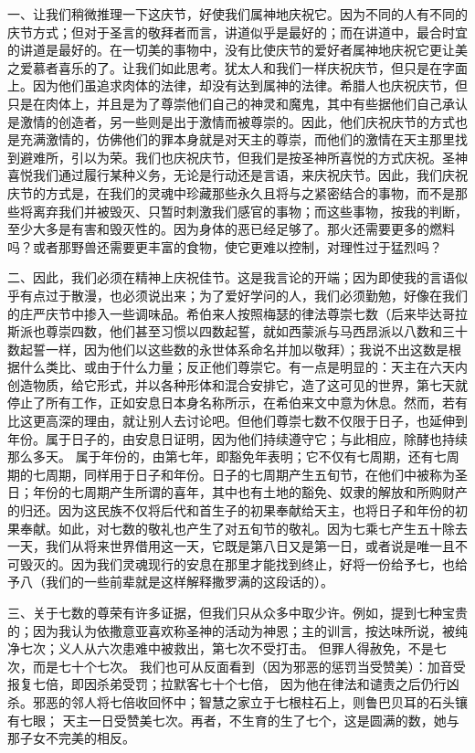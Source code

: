 一、让我们稍微推理一下这庆节，好使我们属神地庆祝它。因为不同的人有不同的庆节方式；但对于圣言的敬拜者而言，讲道似乎是最好的；而在讲道中，最合时宜的讲道是最好的。在一切美的事物中，没有比使庆节的爱好者属神地庆祝它更让美之爱慕者喜乐的了。让我们如此思考。犹太人和我们一样庆祝庆节，但只是在字面上。因为他们虽追求肉体的法律，却没有达到属神的法律。希腊人也庆祝庆节，但只是在肉体上，并且是为了尊崇他们自己的神灵和魔鬼，其中有些据他们自己承认是激情的创造者，另一些则是出于激情而被尊崇的。因此，他们庆祝庆节的方式也是充满激情的，仿佛他们的罪本身就是对天主的尊崇，而他们的激情在天主那里找到避难所，引以为荣。我们也庆祝庆节，但我们是按圣神所喜悦的方式庆祝。圣神喜悦我们通过履行某种义务，无论是行动还是言语，来庆祝庆节。因此，我们庆祝庆节的方式是，在我们的灵魂中珍藏那些永久且将与之紧密结合的事物，而不是那些将离弃我们并被毁灭、只暂时刺激我们感官的事物；而这些事物，按我的判断，至少大多是有害和毁灭性的。因为身体的恶已经足够了。那火还需要更多的燃料吗？或者那野兽还需要更丰富的食物，使它更难以控制，对理性过于猛烈吗？\par

二、因此，我们必须在精神上庆祝佳节。这是我言论的开端；因为即使我的言语似乎有点过于散漫，也必须说出来；为了爱好学问的人，我们必须勤勉，好像在我们的庄严庆节中掺入一些调味品。希伯来人按照梅瑟的律法尊崇七数（后来毕达哥拉斯派也尊崇四数，他们甚至习惯以四数起誓，就如西蒙派与马西昂派以八数和三十数起誓一样，因为他们以这些数的永世体系命名并加以敬拜）；我说不出这数是根据什么类比、或由于什么力量；反正他们尊崇它。有一点是明显的：天主在六天内创造物质，给它形式，并以各种形体和混合安排它，造了这可见的世界，第七天就停止了所有工作，正如安息日本身名称所示，在希伯来文中意为休息。然而，若有比这更高深的理由，就让别人去讨论吧。但他们尊崇七数不仅限于日子，也延伸到年份。属于日子的，由安息日证明，因为他们持续遵守它；与此相应，除酵也持续那么多天。 属于年份的，由第七年，即豁免年表明；它不仅有七周期，还有七周期的七周期，同样用于日子和年份。日子的七周期产生五旬节，在他们中被称为圣日；年份的七周期产生所谓的喜年，其中也有土地的豁免、奴隶的解放和所购财产的归还。因为这民族不仅将后代和首生子的初果奉献给天主，也将日子和年份的初果奉献。如此，对七数的敬礼也产生了对五旬节的敬礼。因为七乘七产生五十除去一天，我们从将来世界借用这一天，它既是第八日又是第一日，或者说是唯一且不可毁灭的。因为我们灵魂现行的安息在那里才能找到终止，好将一份给予七，也给予八（我们的一些前辈就是这样解释撒罗满的这段话的）。\par

三、关于七数的尊荣有许多证据，但我们只从众多中取少许。例如，提到七种宝贵的；因为我认为依撒意亚喜欢称圣神的活动为神恩；主的训言，按达味所说，被纯净七次；义人从六次患难中被救出，第七次不受打击。 但罪人得赦免，不是七次，而是七十个七次。 我们也可从反面看到（因为邪恶的惩罚当受赞美）：加音受报复七倍，即因杀弟受罚；拉默客七十个七倍， 因为他在律法和谴责之后仍行凶杀。邪恶的邻人将七倍收回怀中；智慧之家立于七根柱石上，则鲁巴贝耳的石头镶有七眼； 天主一日受赞美七次。再者，不生育的生了七个，这是圆满的数，她与那子女不完美的相反。\par

